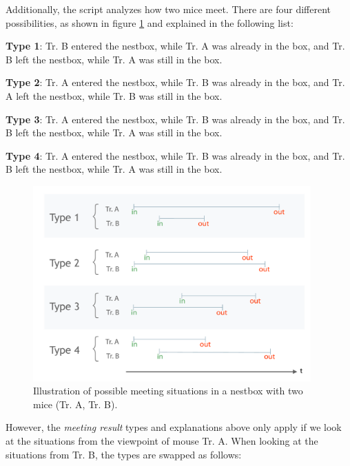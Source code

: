 Additionally, the script analyzes how two mice meet. There are four different possibilities, as shown in figure \ref{fig:meeting_types} and explained in the following list:

\begin{mydesc}
\label{list:meeting_types}
\item \textbf{Type 1}: Tr. B entered the nestbox, while Tr. A was already in the box, and Tr. B left the nestbox, while Tr. A was still in the box. 
\item \textbf{Type 2}: Tr. A entered the nestbox, while Tr. B was already in the box, and Tr. A left the nestbox, while Tr. B was still in the box. 
\item \textbf{Type 3}: Tr. A entered the nestbox, while Tr. B was already in the box, and Tr. B left the nestbox, while Tr. A was still in the box. 
\item \textbf{Type 4}: Tr. A entered the nestbox, while Tr. B was already in the box, and Tr. B left the nestbox, while Tr. A was still in the box. 
\end{mydesc}

\begin{figure}[htpb]
\begin{center}
  \includegraphics[width=0.95\textwidth]{assets/pdf/meeting_types_schema.pdf}
  \caption[Meeting results types illustration]{Illustration of possible meeting situations in a nestbox with two mice (Tr. A, Tr. B).}
  \label{fig:meeting_types}
\end{center}
\end{figure}

However, the \textit{meeting result} types and explanations above only apply if we look at the situations from the viewpoint of mouse Tr. A. When looking at the situations from Tr. B, the types are swapped as follows:

